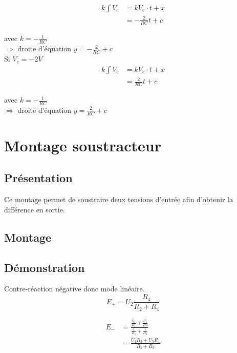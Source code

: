 \begin{align}
k \int V_e &= k V_e\cdot t + x\\
&= - \frac{2}{RC}t+c 
\end{align}

avec $k=-\frac{1}{RC} $ \\

$\Rightarrow$ droite d'équation $y=-\frac{2}{RC}+c$ \\


Si $V_e=-2V$ \\

\begin{align}
k \int V_e &= k V_e\cdot t + x \\
&= \frac{2}{RC}t+c 
\end{align}

avec $k=-\frac{1}{RC} $ \\

$\Rightarrow$ droite d'équation $y=\frac{2}{RC}+c$




\chapter{Montage soustracteur}
\section{Présentation}
Ce montage permet de soustraire deux tensions d’entrée afin d’obtenir la différence en sortie.

\section{Montage}


\section{Démonstration}


Contre-réaction négative donc mode linéaire.\\


$$E_+=U_2\frac{R_4}{R_2+R_4}$$

\begin{align}
E_-&=\frac{\frac{U_1}{R_1}+\frac{U_5}{R3}}{\frac{1}{R_1}+\frac{1}{R_3}}\\
&=\frac{U_1R_3+U_5R_1}{R_1+R_3}
\end{align}

